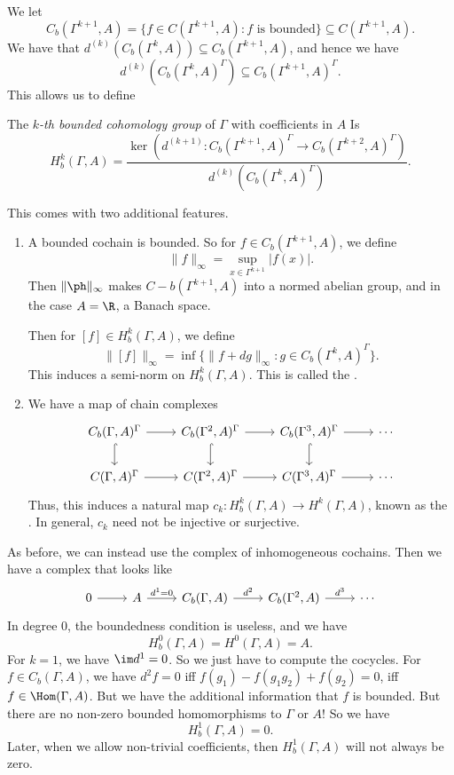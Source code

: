 \documentclass[a4paper]{article}
\begin{document}
We let
\[
  C_b(\Gamma^{k + 1}, A) = \{f \in C(\Gamma^{k + 1}, A) : f\text{ is bounded}\} \subseteq C(\Gamma^{k + 1}, A).
\]
We have that $d^{(k)}(C_b(\Gamma^k, A)) \subseteq C_b(\Gamma^{k + 1}, A)$, and hence we have
\[
  d^{(k)}(C_b(\Gamma^k, A)^\Gamma) \subseteq C_b(\Gamma^{k + 1}, A)^\Gamma.
\]
This allows us to define

\begin{defi}
  The \emph{$k$-th bounded cohomology group} of $\Gamma$ with coefficients in $A$ Is
  \[
    H_b^k(\Gamma, A) = \frac{\ker (d^{(k + 1)} : C_b(\Gamma^{k + 1}, A)^\Gamma \to C_b(\Gamma^{k + 2}, A)^\Gamma)}{d^{(k)}(C_b(\Gamma^k, A)^\Gamma)}.
  \]
\end{defi}

This comes with two additional features.
\begin{enumerate}
  \item A bounded cochain is bounded. So for $f \in C_b(\Gamma^{k + 1}, A)$, we define
    \[
      \|f\|_\infty = \sup_{x \in \Gamma^{k + 1}} |f(x)|.
    \]
    Then $\|\ph\|_\infty$ makes $C-b(\Gamma^{k + 1}, A)$ into a normed abelian group, and in the case $A = \R$, a Banach space.

    Then for $[f] \in H^k_b(\Gamma, A)$, we define
    \[
      \|[f]\|_\infty = \inf \{ \|f + d g\|_\infty : g \in C_b(\Gamma^k, A)^\Gamma\}.
    \]
    This induces a semi-norm on $H^k_b(\Gamma, A)$. This is called the .
  \item We have a map of chain complexes
    \[
      \begin{tikzcd}
        C_b(\Gamma, A)^\Gamma \ar[r] \ar[d, hook] & C_b(\Gamma^2, A)^\Gamma \ar[r] \ar[d, hook] & C_b(\Gamma^3, A)^\Gamma \ar[r] \ar[d, hook] & \cdots\\
        C(\Gamma, A)^\Gamma \ar[r] & C(\Gamma^2, A)^\Gamma \ar[r] & C(\Gamma^3, A)^\Gamma \ar[r] & \cdots
      \end{tikzcd}
    \]
    Thus, this induces a natural map $c_k: H^k_b (\Gamma, A) \to H^k(\Gamma, A)$, known as the . In general, $c_k$ need not be injective or surjective.
\end{enumerate}

As before, we can instead use the complex of inhomogeneous cochains. Then we have a complex that looks like
\[
  \begin{tikzcd}
    0 \ar[r] & A \ar[r, "d^1 = 0"] & C_b(\Gamma, A) \ar[r, "d^2"] & C_b(\Gamma^2, A) \ar[r, "d^3"] & \cdots
  \end{tikzcd}
\]
In degree $0$, the boundedness condition is useless, and we have
\[
  H_b^0(\Gamma, A) = H^0(\Gamma, A) = A.
\]
For $k = 1$, we have $\im d^1 = 0$. So we just have to compute the cocycles. For $f \in C_b(\Gamma, A)$, we have $d^2 f = 0$ iff $f(g_1) - f(g_1 g_2) + f(g_2) = 0$, iff $f \in \Hom(\Gamma, A)$. But we have the additional information that $f$ is bounded. But there are no non-zero bounded homomorphisms to $\Gamma$ or $A$! So we have
\[
  H_b^1(\Gamma, A) = 0.
\]
Later, when we allow non-trivial coefficients, then $H^1_b(\Gamma, A)$ will not always be zero.
\end{document}
